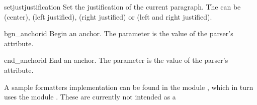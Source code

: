 \begin{funcdesc}{setjust}{justification}
Set the justification of the current paragraph.  The
 can be  (center),  (left
justified),  (right justified) or  (left and
right justified).
\end{funcdesc}

\begin{funcdesc}{bgn_anchor}{id}
Begin an anchor.  The  parameter is the value of the parser's
 attribute.
\end{funcdesc}

\begin{funcdesc}{end_anchor}{id}
End an anchor.  The  parameter is the value of the parser's
 attribute.
\end{funcdesc}

A sample formatters implementation can be found in the module
, which in turn uses the module .  These are
currently not intended as a 
